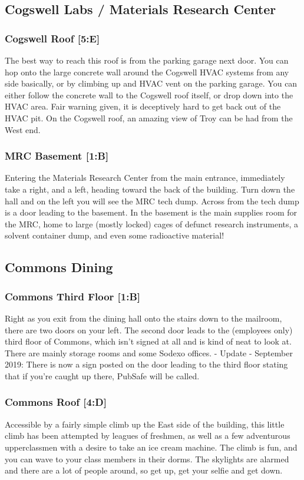 \documentclass{article}
\begin{document}
\pagebreak
\subsection{Cogswell Labs / Materials Research Center}
\subsubsection{Cogswell Roof [5:E]}
The best way to reach this roof is from the parking garage next door. You can hop onto the large concrete wall around the Cogswell HVAC systems from any side basically, or by climbing up and HVAC vent on the parking garage. You can either follow the concrete wall to the Cogswell roof itself, or drop down into the HVAC area. Fair warning given, it is deceptively hard to get back out of the HVAC pit. On the Cogswell roof, an amazing view of Troy can be had from the West end.
\subsubsection{MRC Basement [1:B]}
Entering the Materials Research Center from the main entrance, immediately take a right, and a left, heading toward the back of the building. Turn down the hall and on the left you will see the MRC tech dump. Across from the tech dump is a door leading to the basement. In the basement is the main supplies room for the MRC, home to large (mostly locked) cages of defunct research instruments, a solvent container dump, and even some radioactive material!


\pagebreak
\subsection{Commons Dining}
\subsubsection{Commons Third Floor [1:B]}
Right as you exit from the dining hall onto the stairs down to the mailroom, there are two doors on your left. The second door leads to the (employees only) third floor of Commons, which isn’t signed at all and is kind of neat to look at. There are mainly storage rooms and some Sodexo offices.
- Update - September 2019: There is now a sign posted on the door leading to the third floor stating that if you’re caught up there, PubSafe will be called.
\subsubsection{Commons Roof [4:D]}
Accessible by a fairly simple climb up the East side of the building, this little climb has been attempted by leagues of freshmen, as well as a few adventurous upperclassmen with a desire to take an ice cream machine. The climb is fun, and you can wave to your class members in their dorms. The skylights are alarmed and there are a lot of people around, so get up, get your selfie and get down.
\end{document}
